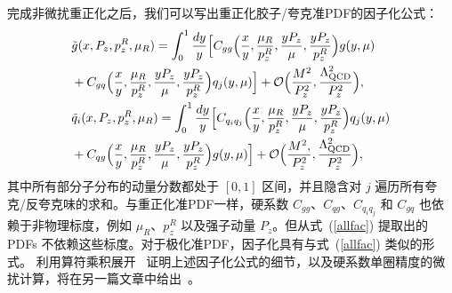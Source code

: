 完成非微扰重正化之后，我们可以写出重正化胶子/夸克准PDF的因子化公式：
\begin{align}\label{allfac}
&\tilde g(x ,P_z, p_z^R, \mu_R)=\int_0^1\frac{dy}{y}\Big[C_{gg}\Big(\frac{x}{y}, \frac{\mu_R}{p_z^R},\frac{y P_z}{\mu}, \frac{y P_z}{p_z^R}\Big)g(y, \mu)\nonumber\\
&+C_{gq}\Big(\frac{x}{y}, \frac{\mu_R}{p_z^R},\frac{y P_z}{\mu}, \frac{y P_z}{p_z^R}\Big)q_j(y, \mu)\Big]+\mathcal O\Big(\frac{M^2}{P_z^2}, \frac{\Lambda_{\rm QCD}^2}{P_z^2}\Big),\nonumber\\
&\tilde q_i(x ,P_z, p_z^R, \mu_R)=\int_0^1\frac{dy}{y}\Big[C_{q_i q_j}\Big(\frac{x}{y}, \frac{\mu_R}{p_z^R},\frac{y P_z}{\mu}, \frac{y P_z}{p_z^R}\Big)q_j(y, \mu)\nonumber\\
&+C_{qg}\Big(\frac{x}{y}, \frac{\mu_R}{p_z^R},\frac{y P_z}{\mu}, \frac{y P_z}{p_z^R}\Big)g(y, \mu)\Big]+\mathcal O\Big(\frac{M^2,}{P_z^2}, \frac{\Lambda_{\rm QCD}^2}{P_z^2}\Big),
\end{align}
其中所有部分子分布的动量分数都处于 $[0,1]$ 区间，并且隐含对 $j$ 遍历所有夸克/反夸克味的求和。与重正化准PDF一样，硬系数 $C_{gg}$、$C_{qg}$、$C_{q_i q_j}$ 和 $C_{gq}$ 也依赖于非物理标度，例如 $\mu_R$、$p_z^R$ 以及强子动量 $P_z$。但从式~(\ref{allfac}) 提取出的 PDFs 不依赖这些标度。对于极化准PDF，因子化具有与式~(\ref{allfac}) 类似的形式。
利用算符乘积展开~\cite{Izubuchi:2018srq} 证明上述因子化公式的细节，以及硬系数单圈精度的微扰计算，将在另一篇文章中给出~\cite{Todo:2018glu}。
